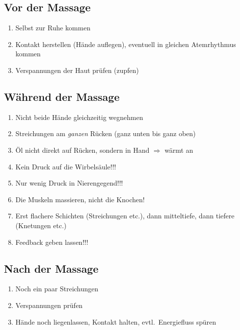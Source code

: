 \subsection{Vor der Massage}
\begin{enumerate}
\item Selbst zur Ruhe kommen
\item Kontakt herstellen (Hände auflegen), eventuell in gleichen Atemrhythmus kommen
\item Verspannungen der Haut prüfen (zupfen)
\end{enumerate}

\subsection{Während der Massage}
\begin{enumerate}
\item Nicht beide Hände gleichzeitig wegnehmen
\item Streichungen am \emph{ganzen} Rücken (ganz unten bis ganz oben)
\item Öl nicht direkt auf Rücken, sondern in Hand $\Rightarrow$ wärmt an
\item Kein Druck auf die Wirbelsäule!!!
\item Nur wenig Druck in Nierengegend!!!
\item Die Muskeln massieren, nicht die Knochen!
\item Erst flachere Schichten (Streichungen etc.), dann mitteltiefe, dann tiefere (Knetungen etc.)
\item Feedback geben lassen!!!
\end{enumerate}

\subsection{Nach der Massage}
\begin{enumerate}
\item Noch ein paar Streichungen
\item Verspannungen prüfen
\item Hände noch liegenlassen, Kontakt halten, evtl.~Energiefluss spüren
\end{enumerate}

